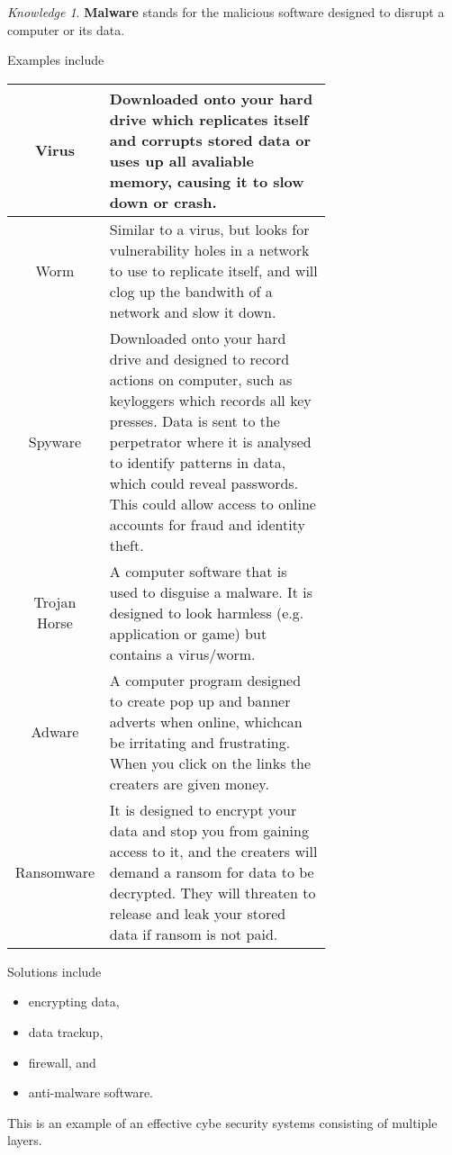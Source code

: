\documentclass[8pt]{article}
\theoremstyle{remark}
\newtheorem{knowledge}{Knowledge}[subsection]
\begin{document}
            \begin{knowledge}
                \textbf{Malware} stands for the malicious software designed to disrupt a computer or its data.

                Examples include
                \begin{center}
                    \begin{tabular}{c|p{0.7\linewidth}}
                        Virus & Downloaded onto your hard drive which replicates itself and corrupts stored data or uses up all avaliable memory, causing it to slow down or crash.\\\hline
                        Worm & Similar to a virus, but looks for vulnerability holes in a network to use to replicate itself, and will clog up the bandwith of a network and slow it down.\\\hline
                        Spyware & Downloaded onto your hard drive and designed to record actions on computer, such as keyloggers which records all key presses. Data is sent to the perpetrator where  it is analysed to identify patterns in data, which could reveal passwords. This could allow access to online accounts for fraud and identity theft.\\\hline
                        Trojan Horse & A computer software that is used to disguise a malware. It is designed to look harmless (e.g. application or game) but contains a virus/worm.\\\hline
                        Adware & A computer program designed to create pop up and banner adverts when online, whichcan be irritating and frustrating. When you click on the links the creaters are given money.\\\hline
                        Ransomware & It is designed to encrypt your data and stop you from gaining access to it, and the creaters will demand a ransom for data to be decrypted. They will threaten to release and leak your stored data if ransom is not paid.
                    \end{tabular}
                \end{center}
                
                Solutions include
                \begin{itemize}
                    \item encrypting data,
                    \item data trackup,
                    \item firewall, and
                    \item anti-malware software.
                \end{itemize}

                This is an example of an effective cybe security systems consisting of multiple layers.
            \end{knowledge}
            
\end{document}
